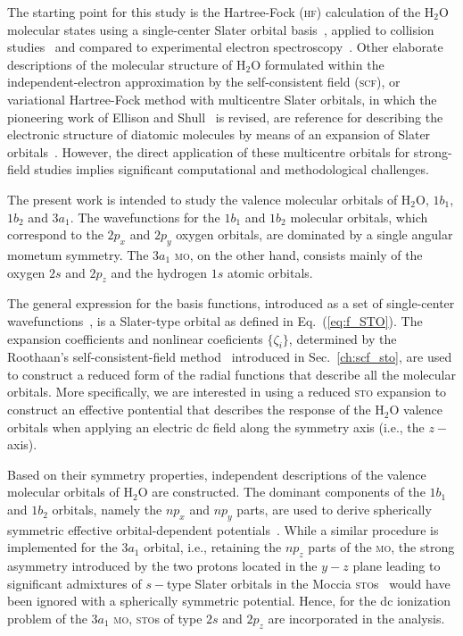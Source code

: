 The starting point for this study is the Hartree-Fock (\textsc{hf})
calculation of the H$_{2}$O molecular states using a single-center
Slater orbital
basis~\cite{Moccia_1964,Moccia_JCP_2164,Moccia_JCP_2176}, applied to
collision studies~\cite{Montanari_2013} and compared to experimental
electron spectroscopy~\cite{Hafied_2007}. Other elaborate descriptions
of the molecular structure of H$_{2}$O formulated within the
independent-electron approximation by the self-consistent field
(\textsc{scf}), or variational Hartree-Fock method with multicentre
Slater orbitals, in which the pioneering work of Ellison and
Shull~\cite{EllisonShullh2o_1955} is revised, are reference for
describing the electronic structure of diatomic molecules by means of
an expansion of Slater
orbitals~\cite{Pitzer_1968,Pitzer_1970}. However, the direct
application of these multicentre orbitals for strong-field studies
implies significant computational and methodological challenges.

The present work is intended to study the valence molecular orbitals
of H$_{2}$O, $1b_{1}$, $1b_{2}$ and $3a_{1}$. The wavefunctions for
the $1b_{1}$ and $1b_{2}$ molecular orbitals, which correspond to the
$2p_{x}$ and $2p_{y}$ oxygen orbitals, are dominated by a single
angular mometum symmetry. The $3a_{1}$ \textsc{mo}, on the other hand,
consists mainly of the oxygen $2s$ and $2p_{z}$ and the hydrogen $1s$
atomic orbitals.

The general expression for the basis functions, introduced as a set of
single-center
wavefunctions~\cite{Moccia_1964,Moccia_JCP_2164,Moccia_JCP_2176}, is a
Slater-type orbital as defined in Eq.~(\ref{eq:f_STO}). The expansion
coefficients and nonlinear coeficients $\{\zeta_{i}\}$, determined by
the Roothaan's self-consistent-field
method~\cite{Moccia_1964,Roothaan_1951} introduced in
Sec.~\ref{ch:scf_sto}, are used to construct a reduced form of the
radial functions that describe all the molecular orbitals. More
specifically, we are interested in using a reduced \textsc{sto}
expansion to construct an effective pontential that describes the
response of the H$_{2}$O valence orbitals when applying an electric dc
field along the symmetry axis (i.e., the $z-$axis).

Based on their symmetry properties, independent descriptions of the
valence molecular orbitals of H$_{2}$O are constructed. The dominant
components of the $1b_{1}$ and $1b_{2}$ orbitals, namely the $np_{x}$
and $np_{y}$ parts, are used to derive spherically symmetric effective
orbital-dependent potentials~\cite{sarias_2016}. While a similar
procedure is implemented for the $3a_{1}$ orbital, i.e., retaining the
$np_{z}$ parts of the \textsc{mo}, the strong asymmetry introduced by
the two protons located in the $y-z$ plane leading to significant
admixtures of $s-$type Slater orbitals in the Moccia
\textsc{sto}s~\cite{Moccia_1964} would have been ignored with a
spherically symmetric potential. Hence, for the dc ionization problem
of the $3a_{1}$ \textsc{mo}, \textsc{sto}s of type $2s$ and $2p_{z}$
are incorporated in the analysis.


